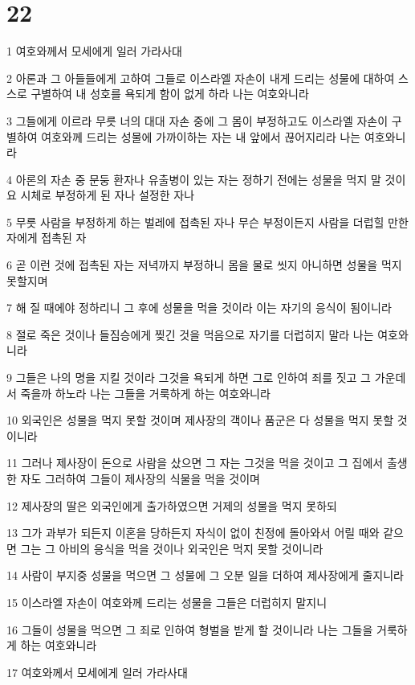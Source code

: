 \chapter{22}

\par 1 여호와께서 모세에게 일러 가라사대
\par 2 아론과 그 아들들에게 고하여 그들로 이스라엘 자손이 내게 드리는 성물에 대하여 스스로 구별하여 내 성호를 욕되게 함이 없게 하라 나는 여호와니라
\par 3 그들에게 이르라 무릇 너의 대대 자손 중에 그 몸이 부정하고도 이스라엘 자손이 구별하여 여호와께 드리는 성물에 가까이하는 자는 내 앞에서 끊어지리라 나는 여호와니라
\par 4 아론의 자손 중 문둥 환자나 유출병이 있는 자는 정하기 전에는 성물을 먹지 말 것이요 시체로 부정하게 된 자나 설정한 자나
\par 5 무릇 사람을 부정하게 하는 벌레에 접촉된 자나 무슨 부정이든지 사람을 더럽힐 만한 자에게 접촉된 자
\par 6 곧 이런 것에 접촉된 자는 저녁까지 부정하니 몸을 물로 씻지 아니하면 성물을 먹지 못할지며
\par 7 해 질 때에야 정하리니 그 후에 성물을 먹을 것이라 이는 자기의 응식이 됨이니라
\par 8 절로 죽은 것이나 들짐승에게 찢긴 것을 먹음으로 자기를 더럽히지 말라 나는 여호와니라
\par 9 그들은 나의 명을 지킬 것이라 그것을 욕되게 하면 그로 인하여 죄를 짓고 그 가운데서 죽을까 하노라 나는 그들을 거룩하게 하는 여호와니라
\par 10 외국인은 성물을 먹지 못할 것이며 제사장의 객이나 품군은 다 성물을 먹지 못할 것이니라
\par 11 그러나 제사장이 돈으로 사람을 샀으면 그 자는 그것을 먹을 것이고 그 집에서 출생한 자도 그러하여 그들이 제사장의 식물을 먹을 것이며
\par 12 제사장의 딸은 외국인에게 출가하였으면 거제의 성물을 먹지 못하되
\par 13 그가 과부가 되든지 이혼을 당하든지 자식이 없이 친정에 돌아와서 어릴 때와 같으면 그는 그 아비의 응식을 먹을 것이나 외국인은 먹지 못할 것이니라
\par 14 사람이 부지중 성물을 먹으면 그 성물에 그 오분 일을 더하여 제사장에게 줄지니라
\par 15 이스라엘 자손이 여호와께 드리는 성물을 그들은 더럽히지 말지니
\par 16 그들이 성물을 먹으면 그 죄로 인하여 형벌을 받게 할 것이니라 나는 그들을 거룩하게 하는 여호와니라
\par 17 여호와께서 모세에게 일러 가라사대
